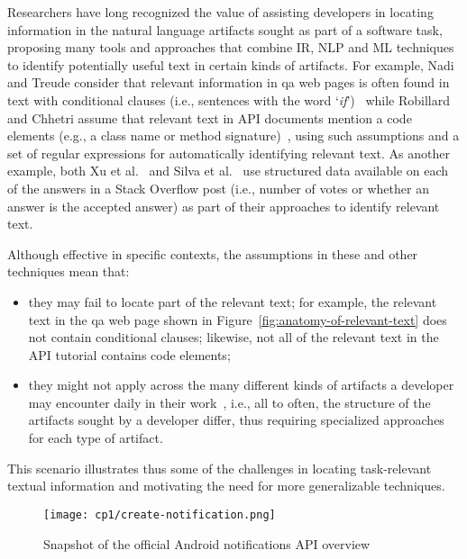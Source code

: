 Researchers have long recognized the value of 
 assisting developers in locating information in the natural language artifacts sought as part of a software task,
proposing many tools and approaches 
that combine \acf{IR}, \acf{NLP} and \acf{ML} techniques to identify potentially useful text in certain kinds of artifacts. 
For example, Nadi and Treude consider 
that relevant information in \acs{qa} 
web pages is often found in text with
conditional clauses (i.e., sentences with the word `\textit{if}')~\cite{nadi2020}
while Robillard and Chhetri assume that relevant 
text in API documents mention a code elements (e.g., a class name or method signature)~\cite{Robillard2015}, using such assumptions and a set of regular expressions 
for automatically identifying relevant text.
As another example, both Xu et al.~\cite{Xu2017} 
and Silva et al.~\cite{silva2019} use 
structured data available on each of the answers in a Stack Overflow post 
(i.e., number of votes or whether an answer is the accepted answer)
as part of their approaches to identify relevant text.



Although effective in specific contexts,
the assumptions in these and other techniques mean that:

\begin{itemize}
    \item they may fail to locate part of the relevant text; for example, the relevant text in the \acs{qa} web page shown in Figure~\ref{fig:anatomy-of-relevant-text} does not contain conditional clauses; likewise, not all of the relevant text in the API tutorial contains code elements;
    \item they might not apply across the
    many different kinds of artifacts a developer may encounter
    daily in their work~\cite{Li2013}, i.e., all to often, the structure of 
    the artifacts sought by a developer differ, thus requiring specialized 
    approaches for each type of artifact.
\end{itemize}


This scenario illustrates thus some of the challenges in locating task-relevant textual
information and motivating the need for more generalizable techniques.



\clearpage


\begin{landscape}
\begin{figure}
    \centering
    \texttt{[image: cp1/create-notification.png]}
    \caption{Snapshot of the official Android notifications API overview}
    \label{fig:android-create-notification}
\end{figure}
\end{landscape}


